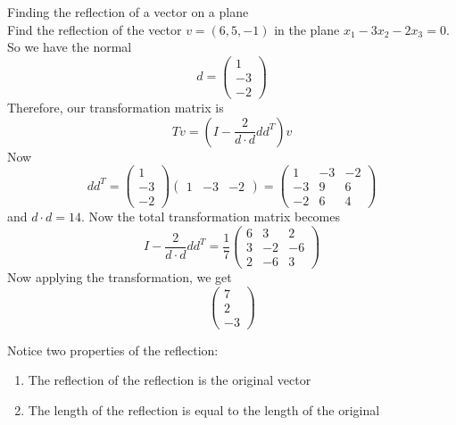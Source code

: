 \documentclass[journal, letterpaper]{IEEEtran}
\begin{document}
    \begin{myboxg}{Finding the reflection of a vector on a plane} \\
        Find the reflection of the vector $v = (6, 5, -1)$ in the plane $x_1 - 3x_2 - 2x_3 = 0$.
        \newline \\ 
        So we have the normal 
        $$ d = \begin{pmatrix}
            1 \\ -3 \\ -2
        \end{pmatrix}$$
        Therefore, our transformation matrix is
        $$ Tv = \left(I - \frac{2}{d\cdot d}dd^T\right)v$$
        Now 
        $$ dd^T = \begin{pmatrix}
            1 \\ -3 \\ -2
        \end{pmatrix}\begin{pmatrix}
            1 & -3 & -2
        \end{pmatrix} = \begin{pmatrix}
            1 & -3 & -2 \\ -3 & 9 & 6 \\ -2 & 6 & 4
        \end{pmatrix}$$
        and $d\cdot d = 14$. Now the total transformation matrix becomes
        $$ I - \frac{2}{d\cdot d}dd^T = \frac{1}{7}\begin{pmatrix}
            6 & 3 & 2 \\ 3 & -2 & -6 \\ 2 & -6 & 3
        \end{pmatrix}$$
        Now applying the transformation, we get
        $$ \begin{pmatrix}
            7 \\ 2 \\ -3
        \end{pmatrix}$$
    \end{myboxg}
    Notice two properties of the reflection:
    \begin{enumerate}
        \item The reflection of the reflection is the original vector
        \item The length of the reflection is equal to the length of the original
    \end{enumerate}
\end{document}
